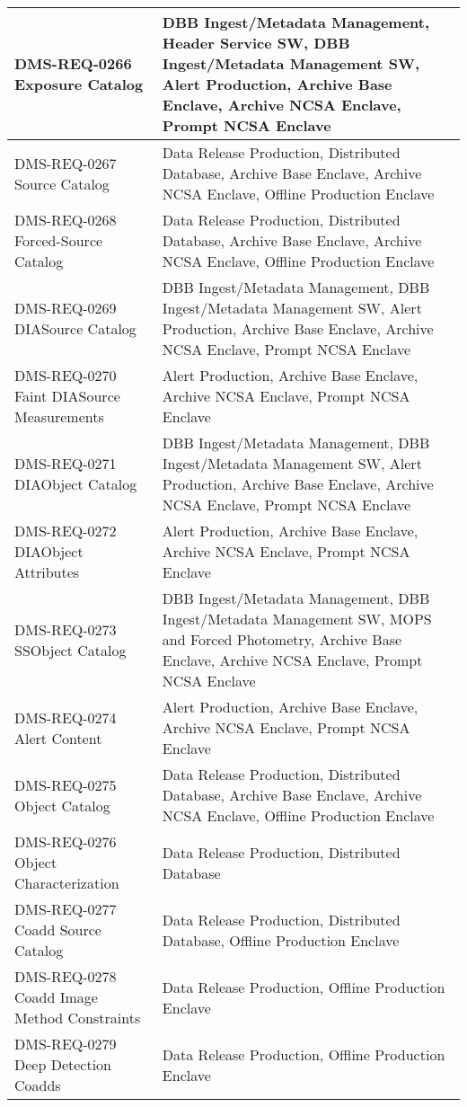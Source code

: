 \begin{longtable}{p{}p{}}
DMS-REQ-0266 Exposure Catalog & DBB Ingest/Metadata Management, Header Service SW, DBB Ingest/Metadata Management SW, Alert Production, Archive Base Enclave, Archive NCSA Enclave, Prompt NCSA Enclave \\ \hline
DMS-REQ-0267 Source Catalog & Data Release Production, Distributed Database, Archive Base Enclave, Archive NCSA Enclave, Offline Production Enclave \\ \hline
DMS-REQ-0268 Forced-Source Catalog & Data Release Production, Distributed Database, Archive Base Enclave, Archive NCSA Enclave, Offline Production Enclave \\ \hline
DMS-REQ-0269 DIASource Catalog & DBB Ingest/Metadata Management, DBB Ingest/Metadata Management SW, Alert Production, Archive Base Enclave, Archive NCSA Enclave, Prompt NCSA Enclave \\ \hline
DMS-REQ-0270 Faint DIASource Measurements & Alert Production, Archive Base Enclave, Archive NCSA Enclave, Prompt NCSA Enclave \\ \hline
DMS-REQ-0271 DIAObject Catalog & DBB Ingest/Metadata Management, DBB Ingest/Metadata Management SW, Alert Production, Archive Base Enclave, Archive NCSA Enclave, Prompt NCSA Enclave \\ \hline
DMS-REQ-0272 DIAObject Attributes & Alert Production, Archive Base Enclave, Archive NCSA Enclave, Prompt NCSA Enclave \\ \hline
DMS-REQ-0273 SSObject Catalog & DBB Ingest/Metadata Management, DBB Ingest/Metadata Management SW, MOPS and Forced Photometry, Archive Base Enclave, Archive NCSA Enclave, Prompt NCSA Enclave \\ \hline
DMS-REQ-0274 Alert Content & Alert Production, Archive Base Enclave, Archive NCSA Enclave, Prompt NCSA Enclave \\ \hline
DMS-REQ-0275 Object Catalog & Data Release Production, Distributed Database, Archive Base Enclave, Archive NCSA Enclave, Offline Production Enclave \\ \hline
DMS-REQ-0276 Object Characterization & Data Release Production, Distributed Database \\ \hline
DMS-REQ-0277 Coadd Source Catalog & Data Release Production, Distributed Database, Offline Production Enclave \\ \hline
DMS-REQ-0278 Coadd Image Method Constraints & Data Release Production, Offline Production Enclave \\ \hline
DMS-REQ-0279 Deep Detection Coadds & Data Release Production, Offline Production Enclave \\ \hline

\end{longtable}
